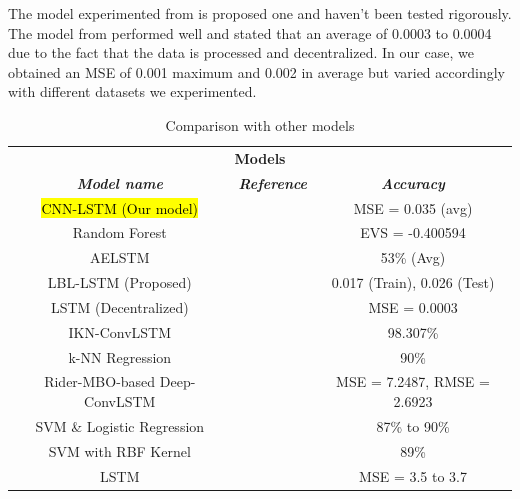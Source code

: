 \documentclass[conference]{IEEEtran}
\begin{document}
The model experimented from \cite{b3} is proposed one and haven't been tested rigorously. The model from \cite{b9} performed well and stated that an average of 0.0003 to 0.0004 due to the fact that the data is processed and decentralized. In our case, we obtained an MSE of 0.001 maximum and 0.002 in average but varied accordingly with different datasets we experimented.

\begin{table}[!htbp]
	\caption{Comparison with other models}
	\begin{center}
		\begin{tabular}{|c|c|c|}
			\hline
			\multicolumn{3}{|c|}{\textbf{Models}} \\
			\cline{1-3} 
			\textbf{\textit{Model name}}& \textbf{\textit{Reference}}& \textbf{\textit{Accuracy}} \\
			\hline
			\hl{CNN-LSTM (Our model)} & & MSE = 0.035 (avg)  \\
			\hline
			Random Forest & \cite{b1} & EVS = -0.400594 \\
			\hline
			AELSTM & \cite{b2} & 53\% (Avg) \\
			\hline
			LBL-LSTM (Proposed) & \cite{b3} & 0.017 (Train), 0.026 (Test) \\
			\hline
			LSTM (Decentralized) & \cite{b9} & MSE = 0.0003 \\
			\hline
			IKN-ConvLSTM & \cite{b14} & 98.307\% \\
			\hline
			k-NN Regression & \cite{b15} & 90\% \\
			\hline
			Rider-MBO-based Deep-ConvLSTM & \cite{b16} & MSE = 7.2487, RMSE = 2.6923 \\
			\hline
			SVM \& Logistic Regression & \cite{b17} & 87\% to 90\% \\
			\hline
			SVM with RBF Kernel & \cite{b18} & 89\% \\
			\hline
			LSTM & \cite{b19} & MSE = 3.5 to 3.7 \\
			\hline
		\end{tabular}
		\label{tab1}
	\end{center}
\end{table}

\FloatBarrier
\end{document}
